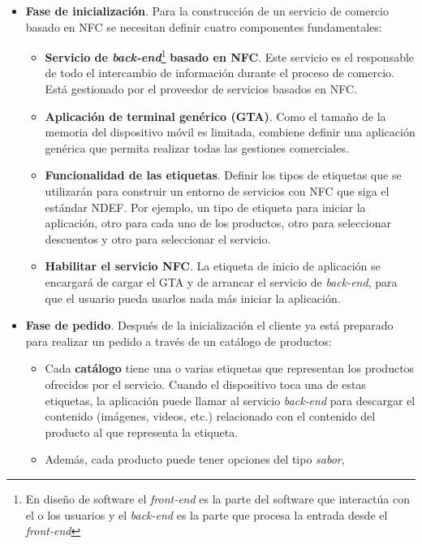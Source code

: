   \begin{itemize}
  \item \textbf{Fase de inicialización}. Para la construcción de un servicio
  de comercio basado en \acs{NFC} se necesitan definir cuatro componentes
  fundamentales:
    \begin{itemize}
    \item \textbf{Servicio de \emph{back-end}}\footnote{En diseño de software
    el \emph{front-end} es la parte del software que interactúa con el o los
    usuarios y el \emph{back-end} es la parte que procesa la entrada desde el
    \emph{front-end}} \textbf{basado en \acs{NFC}}. Este
    servicio es el responsable de todo el intercambio de información durante
    el proceso de comercio. Está gestionado por el proveedor de servicios
    basados en \acs{NFC}.
    \item \textbf{Aplicación de terminal genérico (\acs{GTA})}. Como el tamaño
    de la memoria del dispositivo móvil es limitada, combiene definir una
    aplicación genérica que permita realizar todas las gestiones comerciales.
    \item \textbf{Funcionalidad de las etiquetas}. Definir los tipos de
    etiquetas que se utilizarán para construir un entorno de servicios con
    \acs{NFC} que siga el estándar \acs{NDEF}. Por ejemplo, un tipo de etiqueta
    para iniciar la aplicación, otro para cada uno de los productos, otro
    para seleccionar descuentos y otro para seleccionar el servicio.
    \item \textbf{Habilitar el servicio \acs{NFC}}. La etiqueta de inicio de
    aplicación se encargará de cargar el \acs{GTA} y de arrancar el servicio de
    \emph{back-end}, para que el usuario pueda usarlos nada más iniciar la
    aplicación.
    \end{itemize}
  \item \textbf{Fase de pedido}. Después de la inicialización el cliente ya
  está preparado para realizar un pedido a través de un catálogo de productos:
    \begin{itemize}
    \item Cada \textbf{catálogo} tiene una o varias etiquetas que representan
    los productos ofrecidos por el servicio. Cuando el dispositivo toca una
    de estas etiquetas, la aplicación puede llamar al servicio \emph{back-end}
    para descargar el contenido (imágenes, videos, etc.) relacionado con el
    contenido del producto al que representa la etiqueta.
    \item Además, cada producto puede tener opciones del tipo \emph{sabor},

\end{itemize}
\end{itemize}
